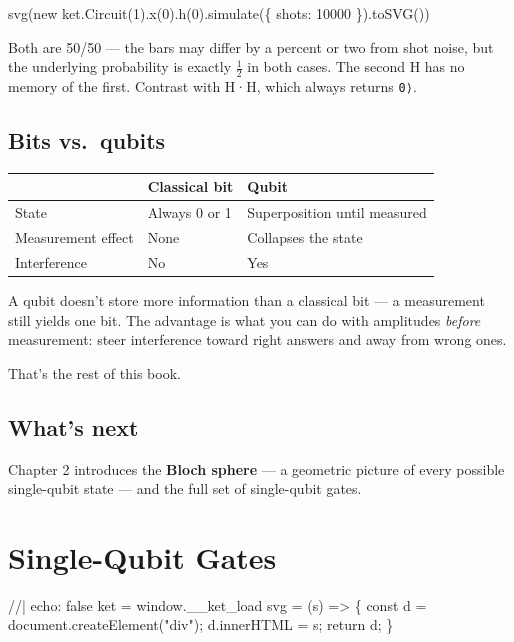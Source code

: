 \documentclass[
  11pt,
  letterpaper,
  oneside]{scrbook}
\newenvironment{Shaded}{\begin{snugshade}}{\end{snugshade}}
\newcommand{\NormalTok}[1]{\textcolor[rgb]{0.00,0.23,0.31}{#1}}
\begin{document}
\begin{Shaded}
\begin{Highlighting}[]
\NormalTok{svg(new ket.Circuit(1).x(0).h(0).simulate(\{ shots: 10000 \}).toSVG())}
\end{Highlighting}
\end{Shaded}

Both are 50/50 --- the bars may differ by a percent or two from shot
noise, but the underlying probability is exactly \(\frac{1}{2}\) in both
cases. The second H has no memory of the first. Contrast with H·H, which
always returns \texttt{\textbar{}0⟩}.

\section{Bits vs.~qubits}\label{bits-vs.-qubits}

\begin{longtable}[]{@{}lll@{}}
\toprule\noalign{}
& Classical bit & Qubit \\
\midrule\noalign{}
\endhead
\bottomrule\noalign{}
\endlastfoot
State & Always 0 or 1 & Superposition until measured \\
Measurement effect & None & Collapses the state \\
Interference & No & Yes \\
\end{longtable}

A qubit doesn't store more information than a classical bit --- a
measurement still yields one bit. The advantage is what you can do with
amplitudes \emph{before} measurement: steer interference toward right
answers and away from wrong ones.

That's the rest of this book.

\section{What's next}\label{whats-next}

Chapter 2 introduces the \textbf{Bloch sphere} --- a geometric picture
of every possible single-qubit state --- and the full set of
single-qubit gates.

\chapter{Single-Qubit Gates}\label{sec-single-qubit}

\begin{Shaded}
\begin{Highlighting}[]
\NormalTok{//| echo: false}
\NormalTok{ket = window.\_\_ket\_load}
\NormalTok{svg = (s) =\textgreater{} \{ const d = document.createElement("div"); d.innerHTML = s; return d; \}}
\end{Highlighting}
\end{Shaded}
\end{document}
